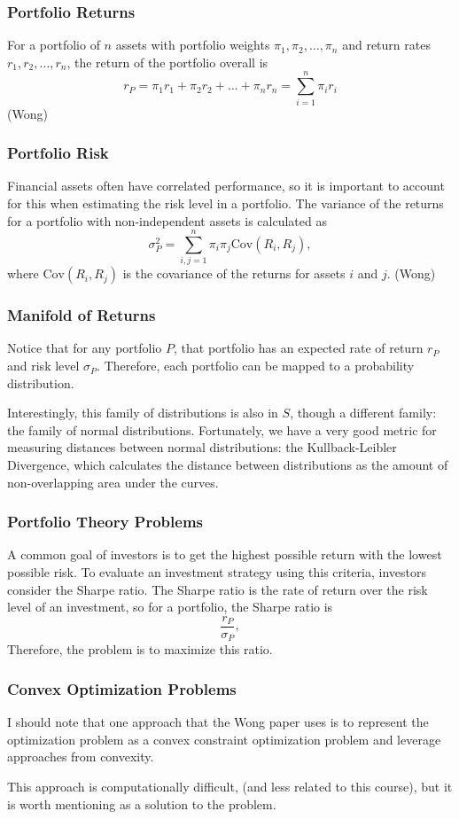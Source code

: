 \documentclass{beamer}
\begin{document}
\begin{frame}
\frametitle{Portfolio Returns}
For a portfolio of $n$ assets with portfolio weights $\pi_1, \pi_2, \dots, \pi_n$ and return rates $r_1, r_2, \dots, r_n$, the return of the portfolio overall is 
\[r_P = \pi_1r_1 +\pi_2r_2 + \dots + \pi_n r_n = \sum_{i=1}^n \pi_i r_i\]
(Wong)
\end{frame}

\begin{frame}
\frametitle{Portfolio Risk}
Financial assets often have correlated performance, so it is important to account for this when estimating the risk level in a portfolio.  The variance of the returns for a portfolio with non-independent assets is calculated as
\[\sigma^2_P = \sum_{i,j=1}^n \pi_i \pi_j \text{Cov} (R_i, R_j),\]
where $\text{Cov} (R_i, R_j)$ is the covariance of the returns for assets $i$ and $j$.  (Wong)
\end{frame}

\begin{frame}
\frametitle{Manifold of Returns}
Notice that for any portfolio $P$, that portfolio has an expected rate of return $r_P$ and risk level $\sigma_P$.  Therefore, each portfolio can be mapped to a probability distribution.

Interestingly, this family of distributions is also in $S$, though a different family: the family of normal distributions.  Fortunately, we have a very good metric for measuring distances between normal distributions: the Kullback-Leibler Divergence, which calculates the distance between distributions as the amount of non-overlapping area under the curves.
\end{frame}

\begin{frame}
\frametitle{Portfolio Theory Problems}
A common goal of investors is to get the highest possible return with the lowest possible risk.  To evaluate an investment strategy using this criteria, investors consider the Sharpe ratio.
The Sharpe ratio is the rate of return over the risk level of an investment, so for a portfolio, the Sharpe ratio is
\[\frac{r_P}{\sigma_P},\]
Therefore, the problem is to maximize this ratio.
\end{frame}

\begin{frame}
\frametitle{Convex Optimization Problems}
I should note that one approach that the Wong paper uses is to represent the optimization problem as a convex constraint optimization problem and leverage approaches from convexity.

This approach is computationally difficult, (and less related to this course), but it is worth mentioning as a solution to the problem.
\end{frame}
\end{document}

